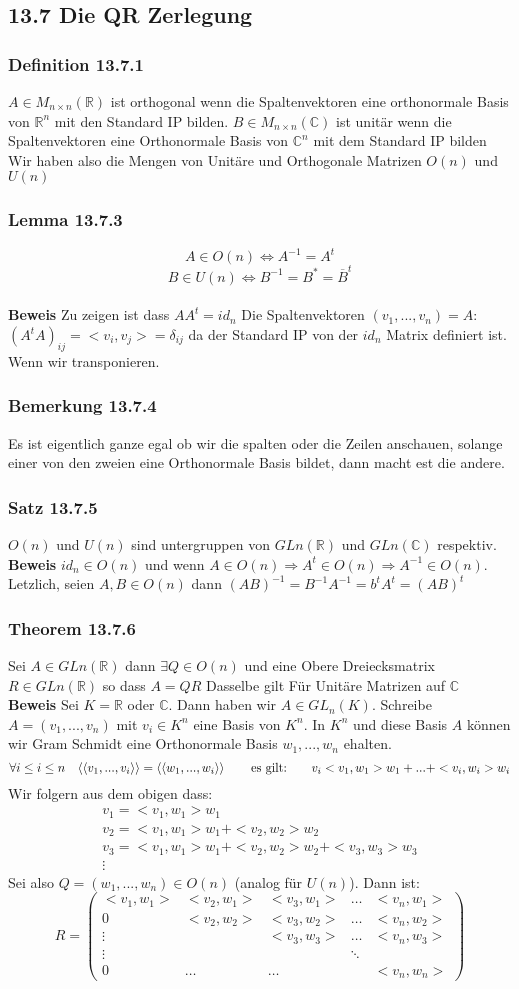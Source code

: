\documentclass{article}
\newcommand{\mspc}{\hspace{0.7cm}}
\newcommand{\smspc}{\hspace{0.3cm}}
\newcommand{\kk}[1]{\left<\left<{#1}\right>\right>}
\newcommand{\satz}[1]{\subsubsection*{Satz {#1}}}
\newcommand{\beweis}{\\\textbf{Beweis }}
\newcommand{\bemerkung}[1]{\subsubsection*{Bemerkung {#1}}}
\newcommand{\theorem}[1]{\subsubsection*{Theorem {#1}}}
\newcommand{\lemma}[1]{\subsubsection*{Lemma {#1}}}
\newcommand{\definition}[1]{\subsubsection*{Definition {#1}}}
\begin{document}
\subsection*{13.7 Die QR Zerlegung}
\definition{13.7.1} $A\in M_{n\times n}(\mathbb{R})$ ist orthogonal wenn die Spaltenvektoren eine orthonormale Basis von $\mathbb{R}^n$ mit den Standard IP bilden.\newline
$B\in M_{n\times n}(\mathbb{C})$ ist unitär wenn die Spaltenvektoren eine Orthonormale Basis von $\mathbb{C}^n$ mit dem Standard IP bilden\newline
Wir haben also die Mengen von Unitäre und Orthogonale Matrizen $O(n)$ und $U(n)$
\lemma{13.7.3} \[A\in O(n)\Leftrightarrow A^{-1}=A^t\]\[B\in U(n)\Leftrightarrow B^{-1}=B^*=\overline{B}^t\]
\beweis Zu zeigen ist dass $AA^t=id_n$ Die Spaltenvektoren $(v_1,...,v_n)=A$: $(A^tA)_{ij}=<v_i,v_j>=\delta_{ij}$ da der Standard IP von der $id_n$ Matrix definiert ist. Wenn wir transponieren.
\bemerkung{13.7.4} Es ist eigentlich ganze egal ob wir die spalten oder die Zeilen anschauen, solange einer von den zweien eine Orthonormale Basis bildet, dann macht est die andere.
\satz{13.7.5} $O(n)$ und $U(n)$ sind untergruppen von $GLn(\mathbb{R})$ und $GLn(\mathbb{C})$ respektiv.
\beweis $id_n\in O(n)$ und wenn $A\in O(n)\Rightarrow A^t\in O(n)\Rightarrow A^{-1}\in O(n)$. Letzlich, seien $A,B\in O(n)$ dann $(AB)^{-1}=B^{-1}A^{-1}=b^tA^t=(AB)^t$
\theorem{13.7.6}
Sei $A\in GLn(\mathbb{R})$ dann $\exists Q\in O(n)$ und eine Obere Dreiecksmatrix $R\in GLn(\mathbb{R})$ so dass $A=QR$\newline
Dasselbe gilt Für Unitäre Matrizen auf $\mathbb{C}$
\beweis Sei $K=\mathbb{R}$ oder $\mathbb{C}$. Dann haben wir $A\in GL_n(K)$. Schreibe $A=(v_1,..., v_n)$ mit $v_i\in K^n$ eine Basis von $K^n$. In $K^n$ und diese Basis $A$ können wir Gram Schmidt eine Orthonormale Basis $w_1,...,w_n$ ehalten.\[\forall i\le i\le n\smspc \kk{v_1,...,v_i}=\kk{w_1,...,w_i}\mspc\text{es gilt:}\mspc v_i<v_1,w_1>w_1+...+<v_i,w_i>w_i\]
Wir folgern aus dem obigen dass: \[\begin{matrix}v_1=<v_1,w_1>w_1\\v_2=<v_1,w_1>w_1+<v_2,w_2>w_2\\v_3=<v_1,w_1>w_1+<v_2,w_2>w_2+<v_3,w_3>w_3\\\vdots\end{matrix}\]
Sei also $Q=(w_1,...,w_n)\in O(n)$ (analog für $U(n)$). Dann ist:
\[R=\begin{pmatrix}<v_1,w_1>&<v_2,w_1>&<v_3,w_1>&\hdots&<v_n,w_1>\\0&<v_2,w_2>&<v_3,w_2>&\hdots&<v_n,w_2>\\\vdots&&<v_3,w_3>&\hdots&<v_n,w_3>\\\vdots& & &\ddots&\\0&\hdots&\hdots& &<v_n,w_n>\end{pmatrix}\]
\end{document}
